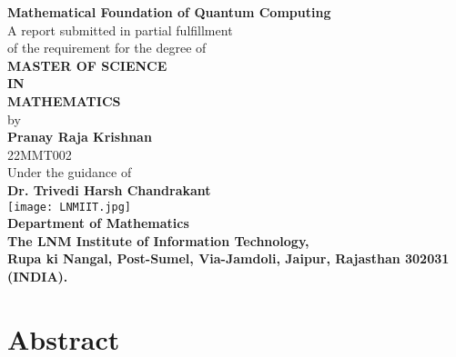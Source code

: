 \documentclass[12pt,twoside,fleqn]{report}
\theoremstyle{thmstyle}
\begin{document}
\begin{titlepage}
    \begin{center}
        \vspace*{0.15cm}
        \Huge{\textbf{\large Mathematical Foundation of Quantum Computing}}\\
        \vspace{0.25cm}
        \small
        A report submitted in partial fulfillment\\
        of the requirement for the  degree of  \\
        \vspace{0.15cm}
        \textbf{MASTER OF SCIENCE \\ IN \\ MATHEMATICS}\\
        \vspace{0.25cm}
        by\\ \vspace{0.25cm}
        \large
        \textbf{Pranay Raja Krishnan}\\
        \vspace{0.15cm}
        \large{22MMT002}\\
        \vspace{0.15cm}
        Under the guidance of\\
        \vspace{0.15cm}
        \textbf{Dr. Trivedi Harsh Chandrakant}\\

        \vspace{1cm}
        \texttt{[image: LNMIIT.jpg]}\\
        \vspace{1cm}
        \large
        \textbf{Department of Mathematics\\
        The LNM Institute of Information Technology,\\ Rupa ki Nangal, Post-Sumel, Via-Jamdoli, Jaipur, Rajasthan 302031 (INDIA).}\\%
    \end{center}
\end{titlepage}

\newpage

\chapter*{Abstract}
\lipsum[1]
\end{document}
